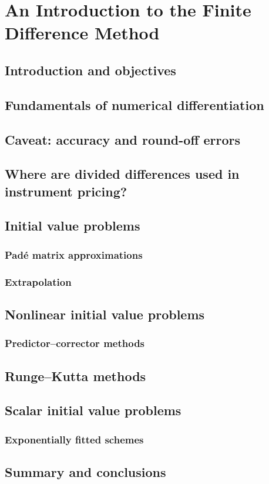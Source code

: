 \chapter{An Introduction to the Finite Difference Method}

\section{Introduction and objectives}

\section{Fundamentals of numerical differentiation}

\section{Caveat: accuracy and round-off errors}

\section{Where are divided differences used in instrument pricing?}

\section{Initial value problems}

\subsection{Padé matrix approximations}

\subsection{Extrapolation}

\section{Nonlinear initial value problems}

\subsection{Predictor–corrector methods}

\section{Runge–Kutta methods}

\section{Scalar initial value problems}

\subsection{Exponentially fitted schemes}

\section{Summary and conclusions}